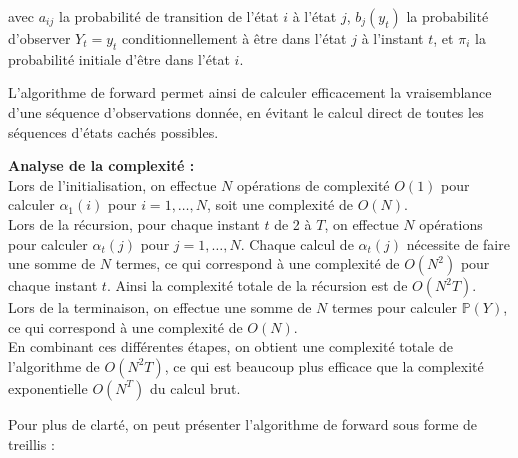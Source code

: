 \documentclass[11pt]{article}
\begin{document}
avec $a_{ij}$ la probabilité de transition de l'état $i$ à l'état $j$, $b_j(y_{t})$ la probabilité d'observer $Y_t = y_t$ conditionnellement à être dans l'état $j$ à l'instant $t$, et $\pi_i$ la probabilité initiale d'être dans l'état $i$.

L'algorithme de forward permet ainsi de calculer efficacement la vraisemblance d'une séquence d'observations donnée, en évitant le calcul direct de toutes les séquences d'états cachés possibles.
\vspace{0.5cm}

\textbf{Analyse de la complexité :}\\
Lors de l'initialisation, on effectue $N$ opérations de complexité $O(1)$ pour calculer $\alpha_1(i)$ pour $i=1, \dots, N$, soit une complexité de $O(N)$.\\
Lors de la récursion, pour chaque instant $t$ de 2 à $T$, on effectue $N$ opérations pour calculer $\alpha_t(j)$ pour $j=1, \dots, N$. Chaque calcul de $\alpha_t(j)$ nécessite de faire une somme de $N$ termes, ce qui correspond à une complexité de $O(N^2)$ pour chaque instant $t$. Ainsi la complexité totale de la récursion est de $O(N^2T)$.\\
Lors de la terminaison, on effectue une somme de $N$ termes pour calculer $\mathbb{P}(Y)$, ce qui correspond à une complexité de $O(N)$.\\
En combinant ces différentes étapes, on obtient une complexité totale de l'algorithme de $O(N^2T)$, ce qui est beaucoup plus efficace que la complexité exponentielle $O(N^T)$ du calcul brut. 

\vspace{0.5cm}

Pour plus de clarté, on peut présenter l'algorithme de forward sous forme de treillis : 
\end{document}
